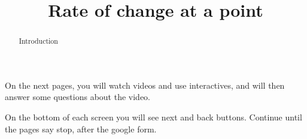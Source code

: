 \documentclass[handout]{ximera}
\title{Rate of change at a point}
\begin{document}
\begin{abstract} Introduction %
\end{abstract}


\maketitle

On the next pages, you will watch videos and use interactives, and will then answer some questions about the video.

On the bottom of each screen you will see next and back buttons. Continue until the pages say stop, after the google form.
\end{document}
